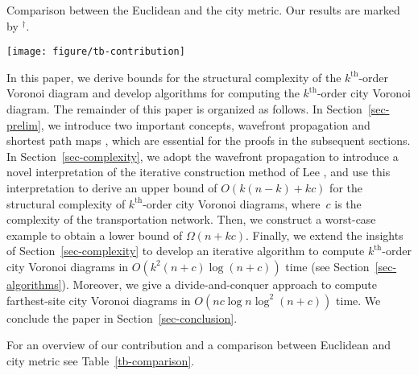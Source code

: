 \documentclass[11pt]{llncs}
\newcommand{\kth}{\ensuremath{k^{\mathrm{th}}}\xspace}
\newcommand{\kthorder}{\kth-order\xspace}
\begin{document}
\begin{table}[tb]
\caption{\small{Comparison between the Euclidean and the city metric. Our results are marked by $^\dag$.}}\label{tb-comparison}
\centering
\hspace*{-1.2 cm}\texttt{[image: figure/tb-contribution]}
\end{table}


In this paper, we derive bounds for the structural complexity of the \kthorder Voronoi diagram
and develop algorithms for computing the \kthorder city Voronoi diagram.
The remainder of this paper is organized as follows.
In Section~\ref{sec-prelim},
we introduce two important concepts, wavefront propagation \cite{AAP-04} and shortest path maps \cite{BKC-09},
which are essential for the proofs in the subsequent sections.
In Section~\ref{sec-complexity},
we adopt the wavefront propagation to introduce a novel interpretation of the iterative construction method of Lee \cite{Lee-82},
and use this interpretation to derive an upper bound of $O(k(n-k)+kc)$ for the structural complexity of \kthorder city Voronoi diagrams,
where~$c$ is the complexity of the transportation network.
Then, we construct a worst-case example to obtain a lower bound of $\Omega(n+kc)$.
Finally,
we extend the insights of Section~\ref{sec-complexity} to develop an
iterative algorithm to compute \kthorder city Voronoi diagrams in $O(k^2(n+c)\log(n+c))$ time
(see Section~\ref{sec-algorithms}).
Moreover, we give a divide-and-conquer approach to compute farthest-site city Voronoi diagrams in $O(nc \log n \log^2(n+c))$ time.
We conclude the paper in Section~\ref{sec-conclusion}.

For an overview of our contribution and a comparison between Euclidean and city metric see Table~\ref{tb-comparison}.
\end{document}
